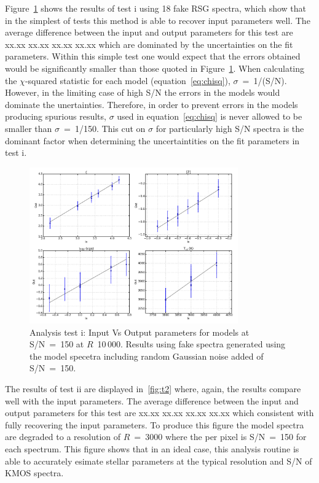 Figure~\ref{fig:t1} shows the results of test i using 18 fake RSG spectra, which show that in the simplest of tests this method is able to recover input parameters well.
The average difference between the input and output parameters for this test are xx.xx xx.xx xx.xx xx.xx which are dominated by the uncertainties on the fit parameters.
Within this simple test one would expect that the errors obtained would be significantly smaller than those quoted in Figure~\ref{fig:t1}.
When calculating the $\chi$-squared statistic for each model (equation~\ref{eq:chisq}), $\sigma$~=~1/(S/N).
However, in the limiting case of high S/N the errors in the models would dominate the unertainties.
Therefore, in order to prevent errors in the models producing spurious results, $\sigma$ used in equation~\ref{eq:chisq} is never allowed to be smaller than $\sigma$~=~1/150.
This cut on $\sigma$ for particularly high S/N spectra is the dominant factor when determining the uncertaintities on the fit parameters in test i.

\begin{figure}
 \centering
 \includegraphics[width=0.80\textwidth]{JAnal/Fakespec-t1-v1}
 \caption[Analysis test i: Input Vs Output parameters for models at S/N~=~150 at $R$~10\,000]{
 Analysis test i: Input Vs Output parameters for models at S/N~=~150 at $R$~10\,000. Results using fake spectra generated using the model specetra including random Gaussian noise added of S/N~=~150.
\label{fig:t1}
         }
\end{figure}


The results of test ii are displayed in~\ref{fig:t2} where, again, the results compare well with the input parameters.
The average difference between the input and output parameters for this test are xx.xx xx.xx xx.xx xx.xx which consistent with fully recovering the input parameters.
To produce this figure the model spectra are degraded to a resolution of $R$~=~3000 where the per pixel is S/N~=~150 for each spectrum.
This figure shows that in an ideal case, this analysis routine is able to accurately esimate stellar parameters at the typical resolution and S/N of KMOS spectra.


